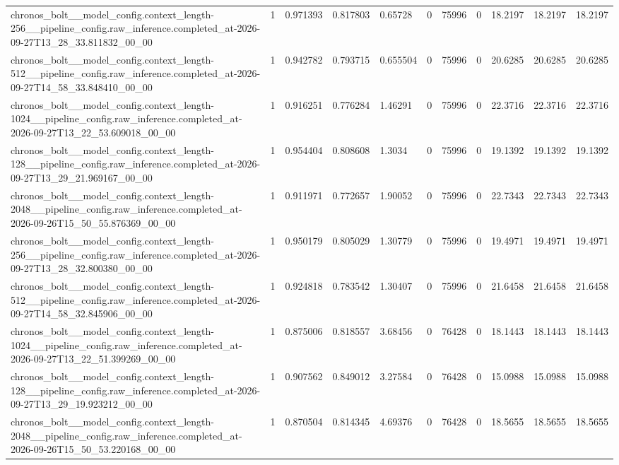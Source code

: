 \begin{tabular}{lllllllllll}
chronos\_bolt\_\_model\_config.context\_length-256\_\_pipeline\_config.raw\_inference.completed\_at-2026-09-27T13\_28\_33.811832\_00\_00 & 1 & 0.971393 & 0.817803 & 0.65728 & 0 & 75996 & 0 & 18.2197 & 18.2197 & 18.2197 \\
chronos\_bolt\_\_model\_config.context\_length-512\_\_pipeline\_config.raw\_inference.completed\_at-2026-09-27T14\_58\_33.848410\_00\_00 & 1 & 0.942782 & 0.793715 & 0.655504 & 0 & 75996 & 0 & 20.6285 & 20.6285 & 20.6285 \\
chronos\_bolt\_\_model\_config.context\_length-1024\_\_pipeline\_config.raw\_inference.completed\_at-2026-09-27T13\_22\_53.609018\_00\_00 & 1 & 0.916251 & 0.776284 & 1.46291 & 0 & 75996 & 0 & 22.3716 & 22.3716 & 22.3716 \\
chronos\_bolt\_\_model\_config.context\_length-128\_\_pipeline\_config.raw\_inference.completed\_at-2026-09-27T13\_29\_21.969167\_00\_00 & 1 & 0.954404 & 0.808608 & 1.3034 & 0 & 75996 & 0 & 19.1392 & 19.1392 & 19.1392 \\
chronos\_bolt\_\_model\_config.context\_length-2048\_\_pipeline\_config.raw\_inference.completed\_at-2026-09-26T15\_50\_55.876369\_00\_00 & 1 & 0.911971 & 0.772657 & 1.90052 & 0 & 75996 & 0 & 22.7343 & 22.7343 & 22.7343 \\
chronos\_bolt\_\_model\_config.context\_length-256\_\_pipeline\_config.raw\_inference.completed\_at-2026-09-27T13\_28\_32.800380\_00\_00 & 1 & 0.950179 & 0.805029 & 1.30779 & 0 & 75996 & 0 & 19.4971 & 19.4971 & 19.4971 \\
chronos\_bolt\_\_model\_config.context\_length-512\_\_pipeline\_config.raw\_inference.completed\_at-2026-09-27T14\_58\_32.845906\_00\_00 & 1 & 0.924818 & 0.783542 & 1.30407 & 0 & 75996 & 0 & 21.6458 & 21.6458 & 21.6458 \\
chronos\_bolt\_\_model\_config.context\_length-1024\_\_pipeline\_config.raw\_inference.completed\_at-2026-09-27T13\_22\_51.399269\_00\_00 & 1 & 0.875006 & 0.818557 & 3.68456 & 0 & 76428 & 0 & 18.1443 & 18.1443 & 18.1443 \\
chronos\_bolt\_\_model\_config.context\_length-128\_\_pipeline\_config.raw\_inference.completed\_at-2026-09-27T13\_29\_19.923212\_00\_00 & 1 & 0.907562 & 0.849012 & 3.27584 & 0 & 76428 & 0 & 15.0988 & 15.0988 & 15.0988 \\
chronos\_bolt\_\_model\_config.context\_length-2048\_\_pipeline\_config.raw\_inference.completed\_at-2026-09-26T15\_50\_53.220168\_00\_00 & 1 & 0.870504 & 0.814345 & 4.69376 & 0 & 76428 & 0 & 18.5655 & 18.5655 & 18.5655 \\

\end{tabular}
